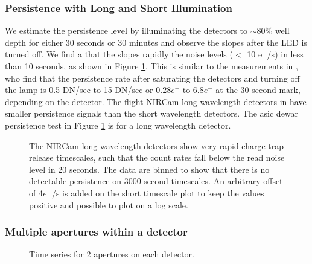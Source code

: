 \documentclass{aastex62}
\begin{document}
\subsubsection{Persistence with Long and Short Illumination}
We estimate the persistence level by illuminating the detectors to $\sim$80\% well depth for either 30 seconds or 30 minutes and observe the slopes after the LED is turned off.
We find a that the slopes rapidly the noise levels ($<$ 10 e$^-$/s) in less than 10 seconds, as shown in Figure \ref{fig:persistenceAZlab04}.
This is similar to the measurements in \citet{leisenring2016persistence}, who find that the persistence rate after saturating the detectors and turning off the lamp is 0.5 DN/sec to 15 DN/sec or 0.28$e^-$ to 6.8$e^-$ at the 30 second mark, depending on the detector.
The flight NIRCam long wavelength detectors in \citet{leisenring2016persistence} have smaller persistence signals than the short wavelength detectors.
The asic dewar persistence test in Figure \ref{fig:persistenceAZlab04} is for a long wavelength detector.

\begin{figure}
{}
\caption{The NIRCam long wavelength detectors show very rapid charge trap release timescales, such that the count rates fall below the read noise level in 20 seconds.
The data are binned to show that there is no detectable persistence on 3000 second timescales.
An arbitrary offset of 4$e^-$/s is added on the short timescale plot to keep the values positive and possible to plot on a log scale.}\label{fig:persistenceAZlab04}
\end{figure}

\clearpage
\subsubsection{Multiple apertures within a detector}
\begin{figure}
{}
{}
{}
\caption{Time series for 2 apertures on each detector.}\label{fig:twoApPerDetector}
\end{figure}
\end{document}
